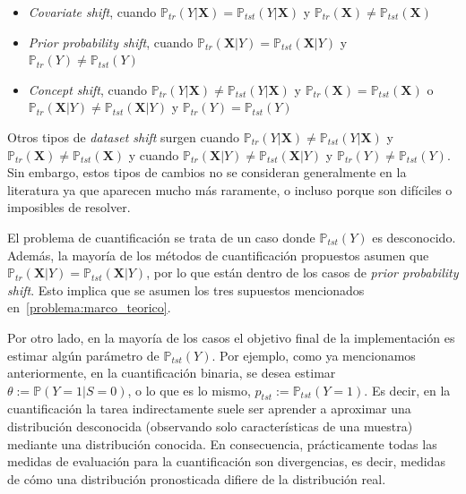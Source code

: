 \begin{itemize}
    \item {\it Covariate shift}, cuando $\mathbb{P}_{tr}(Y|\boldsymbol{X}) =
    \mathbb{P}_{tst}(Y|\boldsymbol{X})$ y $\mathbb{P}_{tr}(\boldsymbol{X}) \neq
    \mathbb{P}_{tst}(\boldsymbol{X})$
    \item {\it Prior probability shift}, cuando
    $\mathbb{P}_{tr}(\boldsymbol{X}|Y) = \mathbb{P}_{tst}(\boldsymbol{X}|Y)$ y
    $\mathbb{P}_{tr}(Y) \neq \mathbb{P}_{tst}(Y)$
    \item {\it Concept shift}, cuando $\mathbb{P}_{tr}(Y|\boldsymbol{X}) \neq
    \mathbb{P}_{tst}(Y|\boldsymbol{X})$ y $\mathbb{P}_{tr}(\boldsymbol{X}) =
    \mathbb{P}_{tst}(\boldsymbol{X})$ o $\mathbb{P}_{tr}(\boldsymbol{X}|Y) \neq
    \mathbb{P}_{tst}(\boldsymbol{X}|Y)$ y $\mathbb{P}_{tr}(Y) =
    \mathbb{P}_{tst}(Y)$
\end{itemize}

Otros tipos de {\it dataset shift\/} surgen cuando
$\mathbb{P}_{tr}(Y|\boldsymbol{X}) \neq \mathbb{P}_{tst}(Y|\boldsymbol{X})$ y
$\mathbb{P}_{tr}(\boldsymbol{X}) \neq \mathbb{P}_{tst}(\boldsymbol{X})$ y cuando
$\mathbb{P}_{tr}(\boldsymbol{X}|Y) \neq \mathbb{P}_{tst}(\boldsymbol{X}|Y)$ y
$\mathbb{P}_{tr}(Y) \neq \mathbb{P}_{tst}(Y)$. Sin embargo, estos tipos de
cambios no se consideran generalmente en la literatura ya que aparecen mucho más
raramente, o incluso porque son difíciles o imposibles de resolver.

El problema de cuantificación se trata de un caso donde $\mathbb{P}_{tst}(Y)$ es
desconocido. Además, la mayoría de los métodos de cuantificación propuestos
asumen que $\mathbb{P}_{tr}(\boldsymbol{X}|Y) =
\mathbb{P}_{tst}(\boldsymbol{X}|Y)$, por lo que están dentro de los casos de
{\it prior probability shift}. Esto implica que se asumen los tres supuestos
mencionados en~\ref{problema:marco_teorico}.

Por otro lado, en la mayoría de los casos el objetivo final de la implementación
es estimar algún parámetro de $\mathbb{P}_{tst}(Y)$. Por ejemplo, como ya
mencionamos anteriormente, en la cuantificación binaria, se desea estimar
$\theta:= \mathbb{P}(Y=1|S=0)$, o lo que es lo mismo, $p_{tst}:=
\mathbb{P}_{tst}(Y=1)$. Es decir, en la cuantificación la tarea indirectamente
suele ser aprender a aproximar una distribución desconocida (observando solo
características de una muestra) mediante una distribución conocida. En
consecuencia, prácticamente todas las medidas de evaluación para la
cuantificación son divergencias, es decir, medidas de cómo una distribución
pronosticada difiere de la distribución real.

